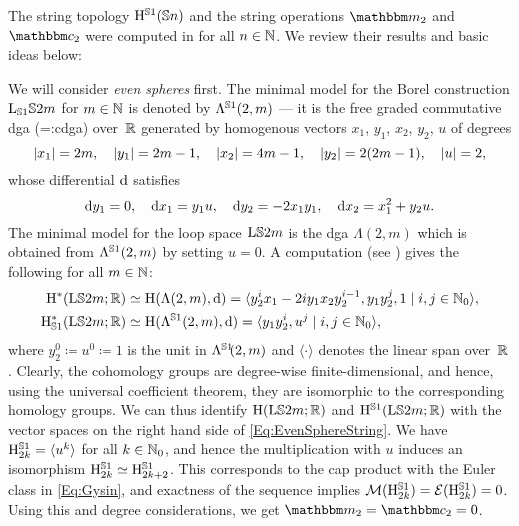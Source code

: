 \documentclass[\MainFolder/Text.tex]{subfiles}
\begin{document}
The string topology $\mathrm{H}^{\mathbb{S}{1}}(\mathbb{S}{n})$ and the string operations $\StringOp_2$ and $\StringCoOp_2$ were computed in \cite{Basu2011} for all $n\in \mathbb{N}$.
We review their results and basic ideas below:

We will consider \emph{even spheres} first. The minimal model for the Borel construction $\mathrm{L}_{\mathbb{S}{1}} \mathbb{S}{2m}$ for $m\in \mathbb{N}$ is denoted by $\Lambda^{\mathbb{S}{1}}(2,m)$ --- it is the free graded commutative dga (=:cdga) over~$\mathbb{R}$ generated by homogenous vectors $x_1$, $y_1$, $x_2$, $y_2$, $u$ of degrees
$$ |x_1| = 2m,\quad |y_1| = 2m - 1, \quad|x_2| = 4m-1,\quad |y_2| = 2(2m - 1),\quad|u| = 2, $$
whose differential $\mathrm{d}$ satisfies
$$ \mathrm{d} y_1 = 0, \quad \mathrm{d} x_1 = y_1 u, \quad \mathrm{d} y_2 = - 2 x_1 y_1, \quad\mathrm{d} x_2 = x_1^2 + y_2 u. $$
The minimal model for the loop space $\mathrm{L} \mathbb{S}{2m}$ is the dga $\Lambda(2,m)$ which is obtained from $\Lambda^{\mathbb{S}{1}}(2,m)$ by setting $u = 0$. A computation (see \cite[Theorem 3.6]{Basu2011}) gives the following for all $m\in \mathbb{N}$:
\begin{equation}\label{Eq:EvenSphereString}
\begin{aligned}
\mathrm{H}^*(\mathrm{L} \mathbb{S}{2m}; \mathbb{R}) &\simeq \mathrm{H}(\Lambda(2,m), \mathrm{d}) =\langle y_2^i x_1 - 2 i y_1 x_2 y_2^{i-1}, y_1 y_2^j, 1 \mid i, j\in \mathbb{N}_0 \rangle,  \\
\mathrm{H}_{\mathbb{S}{1}}^*(\mathrm{L} \mathbb{S}{2m}; \mathbb{R}) &\simeq \mathrm{H}(\Lambda^{\mathbb{S}{1}}(2,m),\mathrm{d}) = \langle y_1 y_2^i, u^j \mid i, j\in \mathbb{N}_0\rangle,
\end{aligned}
\end{equation}
where $y_2^0 \coloneqq u^0 \coloneqq 1$ is the unit in $\Lambda^{\mathrlap{\Sph{1}}\hphantom{S}}(2,m)$ and $\langle \cdot \rangle$ denotes the linear span over~$\mathbb{R}$. Clearly, the cohomology groups are degree-wise finite-dimensional, and hence, using the universal coefficient theorem, they are isomorphic to the corresponding homology groups. We can thus identify $\mathrm{H}(\mathrm{L} \mathbb{S}{2m}; \mathbb{R})$ and $\mathrm{H}^{\mathbb{S}{1}}(\mathrm{L}\mathbb{S}{2m}; \mathbb{R})$ with the vector spaces on the right hand side of \eqref{Eq:EvenSphereString}. We have $\mathrm{H}^{\mathbb{S}{1}}_{2k}= \langle u^k \rangle$ for all $k\in \mathbb{N}_0$, and hence the multiplication with $u$ induces an isomorphism $\mathrm{H}^{\mathbb{S}{1}}_{2k} \simeq \mathrm{H}^{\mathbb{S}{1}}_{2k+2}$. This corresponds to the cap product with the Euler class in \eqref{Eq:Gysin}, and exactness of the sequence implies $\mathcal{M}(\mathrm{H}^{\mathbb{S}{1}}_{2k}) = \mathcal{E}(\mathrm{H}^{\mathbb{S}{1}}_{2k}) = 0$. Using this and degree considerations, we get $\StringOp_2=\StringCoOp_2 = 0$.
\end{document}
